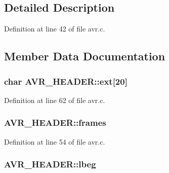 \subsection{Detailed Description}


Definition at line 42 of file avr.\+c.



\subsection{Member Data Documentation}
\subsubsection[{\texorpdfstring{ext}{ext}}]{\setlength{\rightskip}{0pt plus 5cm}char A\+V\+R\+\_\+\+H\+E\+A\+D\+E\+R\+::ext\mbox{[}20\mbox{]}}\hypertarget{struct_a_v_r___h_e_a_d_e_r_a76221e88134aa1ab4a97b99acd9ff03b}{}\label{struct_a_v_r___h_e_a_d_e_r_a76221e88134aa1ab4a97b99acd9ff03b}


Definition at line 62 of file avr.\+c.

\subsubsection[{\texorpdfstring{frames}{frames}}]{ A\+V\+R\+\_\+\+H\+E\+A\+D\+E\+R\+::frames}\hypertarget{struct_a_v_r___h_e_a_d_e_r_ad57b97682159d0979f9e8c2151e8201a}{}\label{struct_a_v_r___h_e_a_d_e_r_ad57b97682159d0979f9e8c2151e8201a}


Definition at line 54 of file avr.\+c.

\subsubsection[{\texorpdfstring{lbeg}{lbeg}}]{ A\+V\+R\+\_\+\+H\+E\+A\+D\+E\+R\+::lbeg}\hypertarget{struct_a_v_r___h_e_a_d_e_r_af538723d1f6f2b0a22e1de0ea2b836ea}{}\label{struct_a_v_r___h_e_a_d_e_r_af538723d1f6f2b0a22e1de0ea2b836ea}


